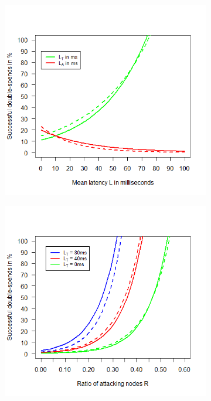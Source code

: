 \documentclass[a4paper,12pt,twoside]{report}
\begin{document}
\begin{figure}
\begin{subfigure}{.495\textwidth}
\end{subfigure}
\begin{subfigure}{.495\textwidth}
  \centering
  \includegraphics[width=\linewidth]{Comparison/bothlat.png}
\end{subfigure}%
\begin{subfigure}{.495\textwidth}
  \centering
  \includegraphics[width=\linewidth]{Comparison/TruLatency/trurat.png}

\end{subfigure}
\end{figure}
\end{document}
